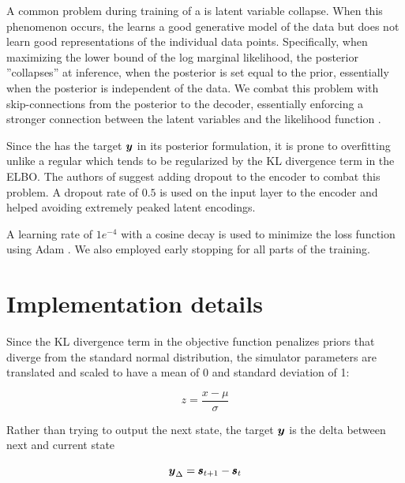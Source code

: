 A common problem during training of a \vae{} is latent variable collapse. When this phenomenon occurs, the \vae{} learns a good generative model of the data but does not learn good representations of the individual data points. Specifically, when maximizing the lower bound of the log marginal likelihood, the posterior ''collapses'' at inference, when the posterior is set equal to the prior, essentially when the posterior is independent of the data. We combat this problem with skip-connections from the posterior to the decoder, essentially enforcing a stronger connection between the latent variables and the likelihood function \parencite{Dieng2018}.

Since the \cvae{} has the target $\boldsymbol{y}$ in its posterior formulation, it is prone to overfitting unlike a regular \vae{} which tends to be regularized by the KL divergence term in the ELBO. The authors of \parencite{Sohn2015} suggest adding dropout to the encoder to combat this problem. A dropout rate of $0.5$ is used on the input layer to the encoder and helped avoiding extremely peaked latent encodings.

A learning rate of $1e^{-4}$ with a cosine decay is used to minimize the loss function using Adam \parencite{kingma2014adam}. We also employed early stopping for all parts of the training.

\section{Implementation details}

Since the KL divergence term in the objective function penalizes priors that diverge from the standard normal distribution, the simulator parameters are translated and scaled to have a mean of 0 and standard deviation of 1:

\begin{equation*}
    z = \frac{x - \mu}{\sigma}
\end{equation*}


Rather than trying to output the next state, the target $\boldsymbol{y}$ is the delta between next and current state

\begin{equation*}
    \boldsymbol{y}_{\Delta} = \pmb{s}_{t+1} - \pmb{s}_t
\end{equation*}



